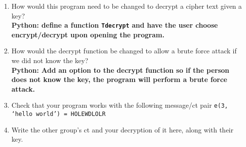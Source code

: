\documentclass[11pt]{article}
\newcommand{\cmark}{\ding{51}}%
\newenvironment{solution}
  {\textit{Solution.}}
\newcommand{\sol}[1]{
    \begin{customframedproof}
        \begin{solution}
        #1
        \end{solution}
    \end{customframedproof}
}
\begin{document}
\begin{enumerate}
    \item	How would this program need to be changed to decrypt a cipher text given a key? \\
          \textbf{Python: define a function \texttt{Tdecrypt} and have the user choose encrypt/decrypt upon opening the program.}



    \item	How would the decrypt function be changed to allow a brute force attack if we did not know the key? \\
          \textbf{Python: Add an option to the decrypt function so if the person does not know the key, the program will perform a brute force attack.}


    \item	Check that your program works with the following message/ct pair
          \texttt{e(3, `hello world') = HOLEWDLOLR} \cmark

        \setcounter{enumi}{5}

    \item Write the other group's ct and your decryption of it here, along with their key.
\end{enumerate}
\end{document}
